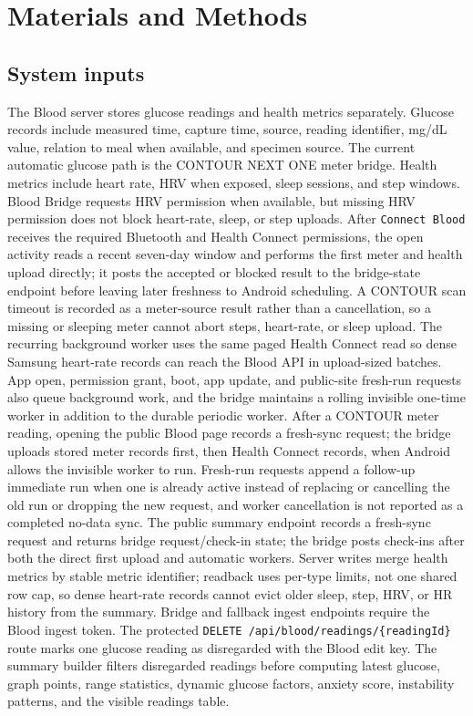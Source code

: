 \documentclass[12pt,letterpaper]{article}
\begin{document}
\section{Materials and Methods}

\subsection{System inputs}

The Blood server stores glucose readings and health metrics separately. Glucose records include measured time, capture time, source, reading identifier, mg/dL value, relation to meal when available, and specimen source. The current automatic glucose path is the CONTOUR NEXT ONE meter bridge. Health metrics include heart rate, HRV when exposed, sleep sessions, and step windows. Blood Bridge requests HRV permission when available, but missing HRV permission does not block heart-rate, sleep, or step uploads. After \texttt{Connect Blood} receives the required Bluetooth and Health Connect permissions, the open activity reads a recent seven-day window and performs the first meter and health upload directly; it posts the accepted or blocked result to the bridge-state endpoint before leaving later freshness to Android scheduling. A CONTOUR scan timeout is recorded as a meter-source result rather than a cancellation, so a missing or sleeping meter cannot abort steps, heart-rate, or sleep upload. The recurring background worker uses the same paged Health Connect read so dense Samsung heart-rate records can reach the Blood API in upload-sized batches. App open, permission grant, boot, app update, and public-site fresh-run requests also queue background work, and the bridge maintains a rolling invisible one-time worker in addition to the durable periodic worker. After a CONTOUR meter reading, opening the public Blood page records a fresh-sync request; the bridge uploads stored meter records first, then Health Connect records, when Android allows the invisible worker to run. Fresh-run requests append a follow-up immediate run when one is already active instead of replacing or cancelling the old run or dropping the new request, and worker cancellation is not reported as a completed no-data sync. The public summary endpoint records a fresh-sync request and returns bridge request/check-in state; the bridge posts check-ins after both the direct first upload and automatic workers. Server writes merge health metrics by stable metric identifier; readback uses per-type limits, not one shared row cap, so dense heart-rate records cannot evict older sleep, step, HRV, or HR history from the summary. Bridge and fallback ingest endpoints require the Blood ingest token. The protected \texttt{DELETE /api/blood/readings/\{readingId\}} route marks one glucose reading as disregarded with the Blood edit key. The summary builder filters disregarded readings before computing latest glucose, graph points, range statistics, dynamic glucose factors, anxiety score, instability patterns, and the visible readings table.
\end{document}
